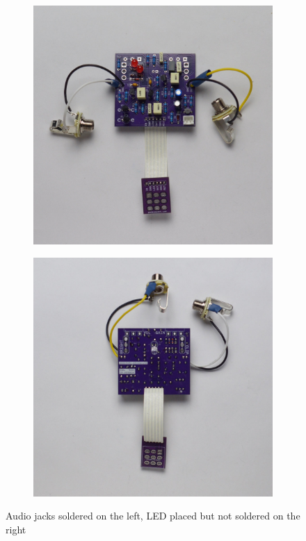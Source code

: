 \documentclass[a4paper,12pt]{article}
\begin{document}
\begin{figure}[h!]
  \centering
  \begin{subfigure}[b]{0.49\textwidth}
    \centering
    \includegraphics[width=\textwidth]{build/17-board-jacks-1000px.jpg}
  \end{subfigure}
  \begin{subfigure}[b]{0.49\textwidth}
    \centering
    \includegraphics[width=\textwidth]{build/18-board-jacks-player-1000px.jpg}
  \end{subfigure}
  \caption{Audio jacks soldered on the left, LED placed but
  not soldered on the right}
\end{figure}
\end{document}
